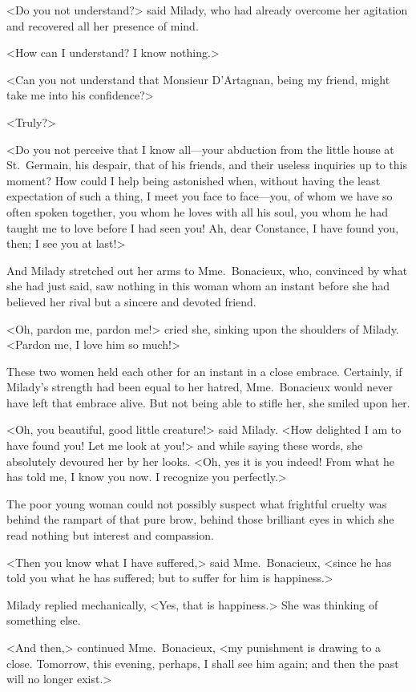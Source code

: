 <Do you not understand?> said Milady, who had already overcome her agitation and recovered all her presence of mind. 

<How can I understand? I know nothing.> 

<Can you not understand that Monsieur D'Artagnan, being my friend, might take me into his confidence?> 

<Truly?> 

<Do you not perceive that I know all—your abduction from the little house at St.~Germain, his despair, that of his friends, and their useless inquiries up to this moment? How could I help being astonished when, without having the least expectation of such a thing, I meet you face to face—you, of whom we have so often spoken together, you whom he loves with all his soul, you whom he had taught me to love before I had seen you! Ah, dear Constance, I have found you, then; I see you at last!> 

And Milady stretched out her arms to Mme.~Bonacieux, who, convinced by what she had just said, saw nothing in this woman whom an instant before she had believed her rival but a sincere and devoted friend. 

<Oh, pardon me, pardon me!> cried she, sinking upon the shoulders of Milady. <Pardon me, I love him so much!> 

These two women held each other for an instant in a close embrace. Certainly, if Milady's strength had been equal to her hatred, Mme.~Bonacieux would never have left that embrace alive. But not being able to stifle her, she smiled upon her. 

<Oh, you beautiful, good little creature!> said Milady. <How delighted I am to have found you! Let me look at you!> and while saying these words, she absolutely devoured her by her looks. <Oh, yes it is you indeed! From what he has told me, I know you now. I recognize you perfectly.> 

The poor young woman could not possibly suspect what frightful cruelty was behind the rampart of that pure brow, behind those brilliant eyes in which she read nothing but interest and compassion. 

<Then you know what I have suffered,> said Mme.~Bonacieux, <since he has told you what he has suffered; but to suffer for him is happiness.> 

Milady replied mechanically, <Yes, that is happiness.> She was thinking of something else. 

<And then,> continued Mme.~Bonacieux, <my punishment is drawing to a close. Tomorrow, this evening, perhaps, I shall see him again; and then the past will no longer exist.> 

